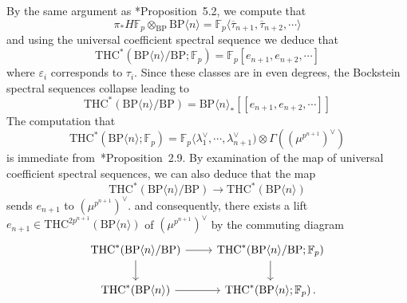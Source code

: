 \documentclass[11pt]{amsart}
\newcommand{\mr}[1]{\mathrm{#1}}
\newcommand{\THC}{\mathrm{THC}}
\newcommand{\BP}{\mr{BP}}
\theoremstyle{definition}
\numberwithin{equation}{section}
\numberwithin{figure}{section}
\begin{document}
By the same argument as \cite{AHL10}*{Proposition~5.2}, we compute that 
\[ \pi_*H\mathbb{F}_p\otimes_{\BP}\BP\langle n\rangle=\mathbb{F}_p\langle \overline{\tau}_{n+1},\overline{\tau}_{n+2},\cdots \rangle\]
and using the universal coefficient spectral sequence we deduce that 
\[ \THC^*(\BP\langle n\rangle/\BP ; \mathbb{F}_p)=\mathbb{F}_p[e_{n+1},e_{n+2},\cdots ]\]
where $\varepsilon_i$ corresponds to $\tau_i$. Since these classes are in even degrees, the Bockstein spectral sequences collapse leading to
\[ 
\THC^*(\BP\langle n\rangle/\BP )=\BP\langle n\rangle_*[[e_{n+1},e_{n+2},\cdots]]
\]
The computation that 
\[ 
\THC^*(\BP\langle n\rangle ; \mathbb{F}_p)=\mathbb{F}_p\langle \lambda_1^{\vee},\cdots ,\lambda_{n+1}^{\vee})\otimes \Gamma ((\mu^{p^{n+1}})^{\vee})
\]
is immediate from~\cite{ACH24}*{Proposition~2.9}. By examination of the map of universal coefficient spectral sequences, we can also deduce that the map
\[ \THC^*(\BP\langle n\rangle/\BP)\to \THC^*(\BP\langle n\rangle)\]
sends $e_{n+1}$ to $(\mu^{p^{n+1}})^{\vee}$. and consequently, there exists a lift $e_{n+1}\in \THC^{2p^{n+1}}(\BP\langle n\rangle)$ of $(\mu^{p^{n+1}})^{\vee}$ by the commuting diagram
\[
\begin{tikzcd}
\THC^*(\BP\langle n\rangle/\BP) \arrow{d} \arrow{r}& \THC^*(\BP\langle n\rangle/\BP;\mathbb{F}_p) \arrow{d}\\
\THC^*(\BP\langle n\rangle)\arrow{r} & \THC^*(\BP\langle n\rangle;\mathbb{F}_p) \,.
\end{tikzcd}
\]
\end{document}

